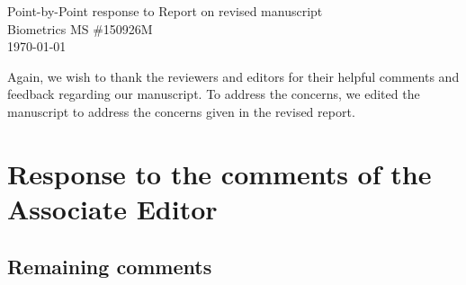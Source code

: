 \documentclass[11pt]{article}
\begin{document}
\begin{center}
Point-by-Point response to Report on revised manuscript\\
Biometrics MS \#150926M\\
\today
\end{center}

Again, we wish to thank the reviewers and editors for their helpful comments and feedback regarding our manuscript. 
To address the concerns, we edited the manuscript to address the concerns given in the revised report.

\section*{Response to the comments of the Associate Editor}
\subsection*{Remaining comments}
\end{document}
